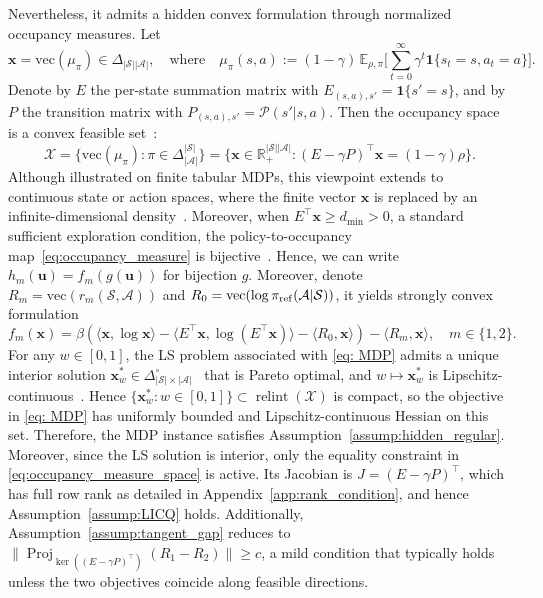 \documentclass{article}
\newcommand{\bx}{\mathbf{x}}
\newcommand{\bu}{\mathbf{u}}
\newcommand{\X}{\mathcal{X}}
\newcommand{\Proj}{\operatorname{Proj}}
\begin{document}
Nevertheless, it admits a hidden convex formulation through normalized occupancy measures. Let
\begin{equation}
\bx=\mathrm{vec}(\mu_\pi) \in \Delta_{|\mathcal{S}||\mathcal{A}|},\quad \text{where}\quad 
\mu_\pi(s,a):=(1-\gamma)\,\mathbb{E}_{\rho,\pi}\big[\textstyle\sum_{t=0}^{\infty}\gamma^t\mathbf{1}\{s_t=s,a_t=a\}\big].
\label{eq:occupancy_measure}
\end{equation}
Denote by $E$ the per-state summation matrix with $E_{(s,a),s'}=\mathbf{1}\{s'=s\}$, and by $P$ the transition matrix with $P_{(s,a),s'}=\mathcal P(s'|s,a)$. 
Then the occupancy space is a convex feasible set~\citep{zhang2020variational,fatkhullin2025stochastic}:
\begin{equation}
\X =
\{\mathrm{vec}(\mu_\pi):\pi\in\Delta_{|\mathcal A|}^{|\mathcal S|}\} = \big\{ \bx\in\mathbb R_+^{|\mathcal S||\mathcal A|}: (E-\gamma P)^\top \bx=(1-\gamma)\rho \big\} .
\label{eq:occupancy_measure_space}
\end{equation}
Although illustrated on finite tabular MDPs, this viewpoint extends to continuous state or action spaces, where the finite vector $\bx$ is replaced by an infinite-dimensional density~\citep{bhatt1996occupation,altman2021constrained}.
Moreover, when $E^\top \bx \geq d_{\min}>0$, a standard sufficient exploration condition, the policy-to-occupancy map~\eqref{eq:occupancy_measure} is bijective~\citep{schlaginhaufen2024towards,zhang2020variational}. Hence, we can write $h_m(\bu)=f_m(g(\bu))$ for bijection $g$. Moreover, denote $R_m=\mathrm{vec}(r_m(\mathcal S,\mathcal A))$ and $R_0=\mathrm{vec}(\log \pi_{\rm ref}(\mathcal A|\mathcal S))$, it yields strongly convex formulation~\citep{schlaginhaufen2024towards}
\begin{equation}
 f_m(\bx) =
 \beta\left(\langle \bx,\log \bx\rangle
 -\langle E^\top \bx,\log(E^\top \bx)\rangle -\langle R_0,\bx\rangle \right)-\langle R_m,\bx\rangle,\quad m \in \{1,2\}.
 \label{eq: MDP}
\end{equation}
For any $w\in[0,1]$, the LS problem associated with \eqref{eq: MDP} admits a unique interior solution $\bx_w^*\in\Delta_{|\mathcal{S}|\times |\mathcal{A}|}^\circ$~\citep{muller2026optimal} that is Pareto optimal, and $w\mapsto \bx_w^*$ is Lipschitz-continuous~\citep[Theorem 2.16]{ito2008lagrange}. Hence $\{\bx_w^*:w\in[0,1]\}\subset\operatorname{relint}(\mathcal X)$ is compact, so the objective in \eqref{eq: MDP} has uniformly bounded and Lipschitz-continuous Hessian on this set. Therefore, the MDP instance satisfies Assumption~\ref{assump:hidden_regular}. Moreover, since the LS solution is interior, only the equality constraint in \eqref{eq:occupancy_measure_space} is active. Its Jacobian is $J=(E-\gamma P)^\top$, which has full row rank as detailed in Appendix~\ref{app:rank_condition}, and hence Assumption~\ref{assump:LICQ} holds. Additionally, Assumption~\ref{assump:tangent_gap} reduces to $\|\Proj_{\ker((E-\gamma P)^\top)}(R_1-R_2)\|\ge c$, a mild condition that typically holds unless the two objectives coincide along feasible directions.
\end{document}
